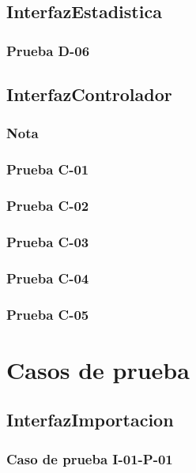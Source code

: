 \documentclass[10pt,a4paper]{article}
\begin{document}
	\subsection{InterfazEstadistica}
			\subsubsection{Prueba D-06}

	\subsection{InterfazControlador}
			\subsubsection{Nota}

			\subsubsection{Prueba C-01}

			\subsubsection{Prueba C-02}

			\subsubsection{Prueba C-03}

			\subsubsection{Prueba C-04}

			\subsubsection{Prueba C-05}

\section{Casos de prueba}
	\subsection{InterfazImportacion}
			\subsubsection{Caso de prueba I-01-P-01}
\end{document}
